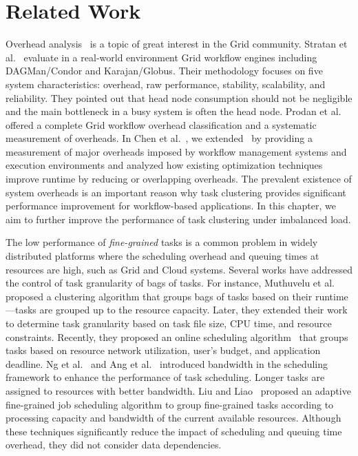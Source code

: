 \documentclass[final,5p,times,twocolumn]{elsarticle}
\begin{document}
\section{Related Work}
\label{sec:related-work}

Overhead analysis~\cite{Ostberg2011, Prodan2008} is a topic of great interest in the Grid community. Stratan et al.~\cite{Stratan2008} evaluate in a real-world environment Grid workflow engines including DAGMan/Condor and Karajan/Globus. Their methodology focuses on five system characteristics: overhead, raw performance, stability, scalability, and reliability. They pointed out that head node consumption should not be negligible and the main bottleneck in a busy system is often the head node. Prodan et al.~\cite{Prodan2008} offered a complete Grid workflow overhead classification and a systematic measurement of overheads. In Chen et al.~\cite{Chen2011}, we extended~\cite{Prodan2008} by providing a measurement of major overheads imposed by workflow management systems and execution environments and analyzed how existing optimization techniques improve runtime by reducing or overlapping overheads. The prevalent existence of system overheads is an important reason why task clustering provides significant performance improvement for workflow-based applications. In this chapter, we aim to further improve the performance of task clustering under imbalanced load. 

The low performance of \emph{fine-grained} tasks is a common problem in widely distributed platforms where the scheduling overhead and queuing times at resources are high, such as Grid and Cloud systems. Several works have addressed the control of task granularity of bags of tasks. For instance, Muthuvelu et al.~\cite{Muthuvelu:2005:DJG:1082290.1082297} proposed a clustering algorithm that groups bags of tasks based on their runtime---tasks are grouped up to the resource capacity. Later, they extended their work~\cite{4493929} to determine task granularity based on task file size, CPU time, and resource constraints. Recently, they proposed an online scheduling algorithm~\cite{Muthuvelu2010,Muthuvelu2013170} that groups tasks based on resource network utilization, user's budget, and application deadline. Ng et al.~\cite{keat-2006} and Ang et al.~\cite{ang-2009} introduced bandwidth in the scheduling framework to enhance the performance of task scheduling. Longer tasks are assigned to resources with better bandwidth. Liu and Liao~\cite{Liu2009} proposed an adaptive fine-grained job scheduling algorithm to group fine-grained tasks according to processing capacity and bandwidth of the current available resources. Although these techniques significantly reduce the impact of scheduling and queuing time overhead, they did not consider data dependencies.
\end{document}
